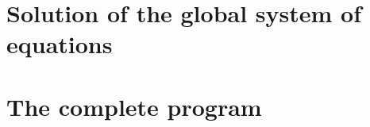
\section{Solution of the global system of equations}
\label{section:poisson:solution}



\section{The complete program}
\label{section:poisson:complete-program}
